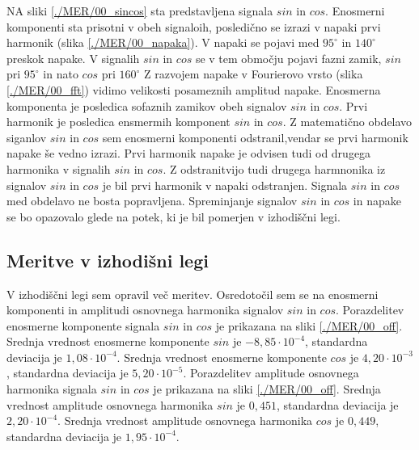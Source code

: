 NA sliki \ref{./MER/00_sincos} sta predstavljena signala $sin$ in $cos$. Enosmerni komponenti sta prisotni v obeh signaloih, posledično se izrazi v napaki prvi harmonik (slika \ref{./MER/00_napaka}).
V napaki se pojavi med $\mathrm{95^\circ}$ in $\mathrm{140^\circ}$ preskok napake. V signalih $sin$ in $cos$ se v tem območju pojavi fazni zamik, $sin$ pri $\mathrm{95^\circ}$ in nato $cos$ pri $\mathrm{160^\circ}$
Z razvojem napake v Fourierovo vrsto (slika \ref{./MER/00_fft}) vidimo velikosti posameznih amplitud napake.
Enosmerna komponenta je posledica sofaznih zamikov obeh signalov $sin$ in $cos$. 
Prvi harmonik je posledica ensmermih komponent $sin$ in $cos$. Z matematično obdelavo siganlov $sin$ in $cos$ sem enosmerni komponenti odstranil,vendar se prvi harmonik napake še vedno izrazi. Prvi harmonik napake je odvisen tudi od drugega harmonika v signalih $sin$ in $cos$.
Z odstranitvijo tudi drugega harmnonika iz signalov $sin$ in $cos$ je bil  prvi harmonik v napaki odstranjen.
Signala  $sin$ in $cos$ med obdelavo ne bosta popravljena. Spreminjanje signalov  $sin$ in $cos$ in napake se bo opazovalo glede na potek, ki je bil pomerjen v izhodiščni legi.

\subsection{Meritve v izhodišni legi}
V izhodiščni legi sem opravil več meritev. Osredotočil sem se na enosmerni komponenti  in amplitudi osnovnega harmonika signalov $sin$ in $cos$. 
Porazdelitev enosmerne komponente signala $sin$ in $cos$ je prikazana na sliki \ref{./MER/00_off}.
Srednja vrednost enosmerne komponente $sin$ je $-8,85 \cdot 10^{-4}$, standardna deviacija je $1,08\cdot 10^{-4}$.
Srednja vrednost enosmerne komponente $cos$ je $4,20 \cdot 10^{-3}$, standardna deviacija je $5,20\cdot 10^{-5}$.
Porazdelitev amplitude osnovnega harmonika signala $sin$ in $cos$ je prikazana na sliki \ref{./MER/00_off}.
Srednja vrednost amplitude osnovnega harmonika $sin$ je $0,451$, standardna deviacija je $2,20\cdot 10^{-4}$.
Srednja vrednost amplitude osnovnega harmonika $cos$ je $0,449$, standardna deviacija je $1,95\cdot 10^{-4}$.
\newpage

